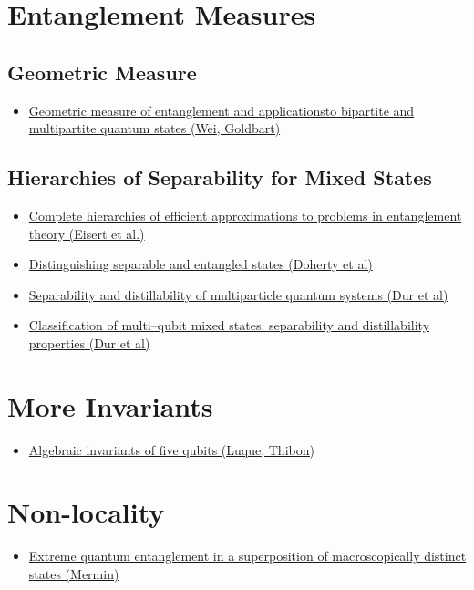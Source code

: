 \documentclass[11pt]{article}
\begin{document}
\section{Entanglement Measures}
\label{sec:org654c442}

\subsection{Geometric Measure}
\label{sec:org4039b25}
\begin{itemize}
\item \href{https://arxiv.org/pdf/quant-ph/0307219.pdf}{Geometric measure of entanglement and applicationsto bipartite and multipartite quantum states (Wei, Goldbart)}
\end{itemize}

\subsection{Hierarchies of Separability for Mixed States}
\label{sec:org739ffae}
\begin{itemize}
\item \href{https://arxiv.org/pdf/quant-ph/0407135.pdf}{Complete hierarchies of efficient approximations to problems in entanglement theory (Eisert et al.)}
\item \href{https://arxiv.org/pdf/quant-ph/0112007.pdf}{Distinguishing separable and entangled states (Doherty et al)}
\item \href{https://arxiv.org/pdf/quant-ph/9903018.pdf}{Separability and distillability of multiparticle quantum systems (Dur et al) }
\item \href{https://arxiv.org/pdf/quant-ph/9911044.pdf}{Classification of multi–qubit mixed states:  separability and distillability properties (Dur et al)}
\end{itemize}

\section{More Invariants}
\label{sec:org05c3381}
\begin{itemize}
\item \href{https://arxiv.org/pdf/quant-ph/0506058.pdf}{Algebraic invariants of five qubits (Luque, Thibon)}
\end{itemize}

\section{Non-locality}
\label{sec:org2c1d95b}
\begin{itemize}
\item \href{https://journals.aps.org/prl/abstract/10.1103/PhysRevLett.65.1838}{Extreme quantum entanglement in a superposition of macroscopically distinct states (Mermin)}
\end{itemize}
\end{document}
